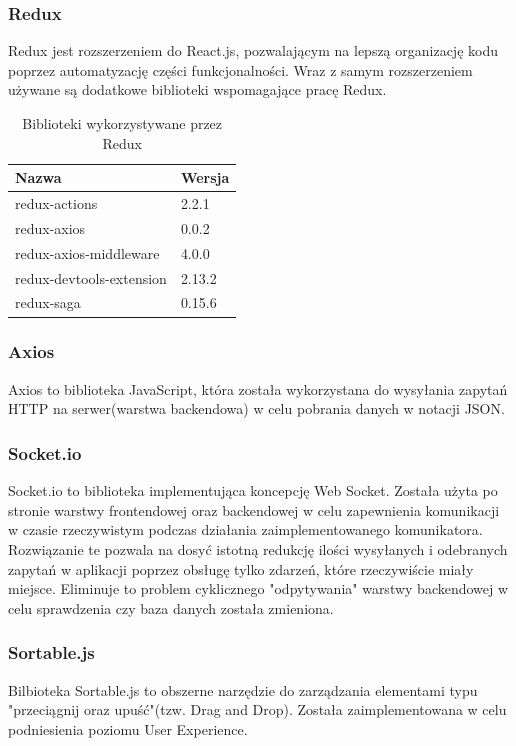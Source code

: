 \documentclass[eng,printmode]{mgr}
\begin{document}
\subsubsection{Redux}
Redux\cite{Redux} jest rozszerzeniem do React.js, pozwalającym na lepszą organizację kodu poprzez automatyzację części funkcjonalności. Wraz z samym rozszerzeniem używane są dodatkowe biblioteki wspomagające pracę Redux.

\begin{table}[H]
\begin{tabularx}{\textwidth}{|X|X|}
   \hline
    \textbf{Nazwa} & \textbf{Wersja} \\
   \hline
    redux-actions & 2.2.1 \\
   \hline
   	redux-axios & 0.0.2 \\
   \hline
  	redux-axios-middleware & 4.0.0 \\
   \hline
   	redux-devtools-extension & 2.13.2 \\
   \hline
  	redux-saga & 0.15.6 \\
   \hline
\end{tabularx}
\caption{Biblioteki wykorzystywane przez Redux}
\end{table}


\subsubsection{Axios}
Axios\cite{Axios} to biblioteka JavaScript, która została wykorzystana do wysyłania zapytań HTTP na serwer(warstwa backendowa) w celu pobrania danych w notacji JSON.

\subsubsection{Socket.io}
Socket.io\cite{SocketIO} to biblioteka implementująca koncepcję Web Socket\cite{Keyword_Websocket}. Została użyta po stronie warstwy frontendowej oraz backendowej w celu zapewnienia komunikacji w czasie rzeczywistym podczas działania zaimplementowanego komunikatora. Rozwiązanie te pozwala na dosyć istotną redukcję ilości wysyłanych i odebranych zapytań w aplikacji poprzez obsługę tylko zdarzeń, które rzeczywiście miały miejsce. Eliminuje to problem cyklicznego "odpytywania" warstwy backendowej w celu sprawdzenia czy baza danych została zmieniona.

\subsubsection{Sortable.js}
Bilbioteka Sortable.js\cite{SortableJS} to obszerne narzędzie do zarządzania elementami typu "przeciągnij oraz upuść"(tzw. Drag and Drop). Została zaimplementowana w celu podniesienia poziomu User Experience\cite{Keyword_UserExperience}.
\end{document}
